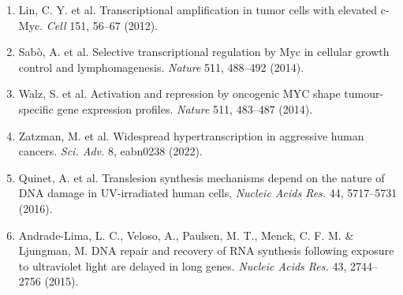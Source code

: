 \documentclass[11pt]{article}
\begin{document}
\begin{enumerate}
functions of CTCF and cohesin in gene regulation. \textit{Nat. Genet.} 57,
3137--3151 (2025).
\item Lin, C. Y. et al. Transcriptional amplification in tumor cells with elevated
c-Myc. \textit{Cell} 151, 56--67 (2012).
\item Sab\`o, A. et al. Selective transcriptional regulation by Myc in cellular growth
control and lymphomagenesis. \textit{Nature} 511, 488--492 (2014).
\item Walz, S. et al. Activation and repression by oncogenic MYC shape tumour-specific
gene expression profiles. \textit{Nature} 511, 483--487 (2014).
\item Zatzman, M. et al. Widespread hypertranscription in aggressive human cancers.
\textit{Sci. Adv.} 8, eabn0238 (2022).
\item Quinet, A. et al. Translesion synthesis mechanisms depend on the nature of DNA
damage in UV-irradiated human cells. \textit{Nucleic Acids Res.} 44, 5717--5731 (2016).
\item Andrade-Lima, L. C., Veloso, A., Paulsen, M. T., Menck, C. F. M. \& Ljungman, M.
DNA repair and recovery of RNA synthesis following exposure to ultraviolet light are
delayed in long genes. \textit{Nucleic Acids Res.} 43, 2744--2756 (2015).
\end{enumerate}
\end{document}
